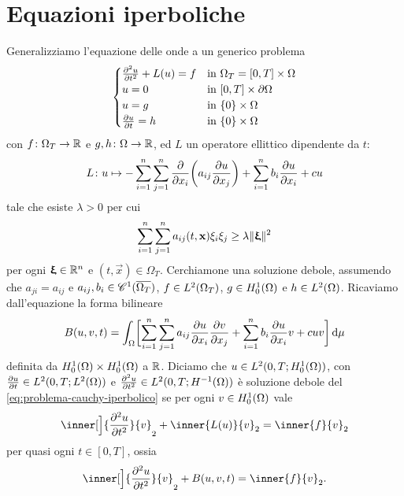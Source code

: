\section{Equazioni iperboliche}
Generalizziamo l'equazione delle onde a un generico problema
\begin{equation}
    \begin{cases}
        \ddrp{u}{t}+L(u)=f & \text{in }\Omega_T=[0,T]\times\Omega\\
        u=0                & \text{in }[0,T]\times\boundary\Omega\\
        u=g                & \text{in }\{0\}\times\Omega\\
        \drp{u}{t}=h       & \text{in }\{0\}\times\Omega
    \end{cases}
    \label{eq:problema-cauchy-iperbolico}
\end{equation}
con $f\colon\Omega_T\to\R$ e $g,h\colon\Omega\to\R$, ed $L$ un operatore ellittico dipendente da $t$:
\begin{equation}
    L\colon u\mapsto -\sum_{i=1}^n\sum_{j=1}^n\drp{}{x_i}\biggl(a_{ij}\drp{u}{x_j}\biggr)+\sum_{i=1}^nb_i\drp{u}{x_i}+cu
\end{equation}
tale che esiste $\lambda>0$ per cui
\begin{equation}
    \sum_{i=1}^n\sum_{j=1}^n a_{ij}(t,\vec x)\xi_i\xi_j \ge \lambda\norm{\vxi}^2
\end{equation}
per ogni $\vxi\in\R^n$ e $(t,\vec x)\in\Omega_T$.
Cerchiamone una soluzione debole, assumendo che $a_{ji}=a_{ij}$ e $a_{ij},b_i\in\cont[1]{\clos{\Omega_T}}$, $f\in\leb[2]{\Omega_T}$, $g\in\sobHc[1]{\Omega}$ e $h\in\leb[2]{\Omega}$.
Ricaviamo dall'equazione la forma bilineare
\begin{equation}
    B(u,v,t)=\int_\Omega\biggl[\sum_{i=1}^n\sum_{j=1}^na_{ij}\drp{u}{x_i}\drp{v}{x_j}+\sum_{i=1}^nb_i\drp{u}{x_i}v+cuv\biggr]\,\dd\mu
    \label{eq:forma-bilineare-iperboliche}
\end{equation}
definita da $\sobHc[1]{\Omega}\times\sobHc[1]{\Omega}$ a $\R$.
Diciamo che $u\in\leb[2]{0,T;\sobHc[1]{\Omega}}$, con $\drp{u}{t}\in\leb[2]{0,T;\leb[2]{\Omega}}$ e $\ddrp{u}{t}\in\leb[2]{0,T;\sobH[-1]{\Omega}}$ è soluzione debole del \eqref{eq:problema-cauchy-iperbolico} se per ogni $v\in\sobHc[1]{\Omega}$ vale
\begin{equation}
    \inner[\Big]{\ddrp{u}{t}}{v}_2+\inner{L(u)}{v}_2=\inner{f}{v}_2
\end{equation}
per quasi ogni $t\in[0,T]$, ossia
\begin{equation}
    \inner[\Big]{\ddrp{u}{t}}{v}_2+B(u,v,t)=\inner{f}{v}_2.
\end{equation}
